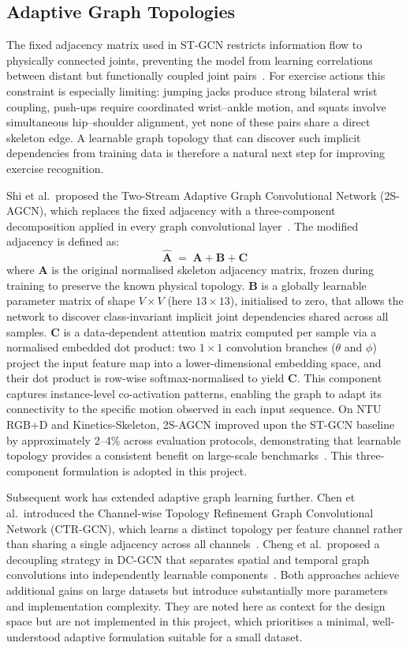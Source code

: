 \subsection{Adaptive Graph Topologies}
The fixed adjacency matrix used in ST-GCN restricts information flow to physically connected joints, preventing the model from learning correlations between distant but functionally coupled joint pairs~\cite{shi2019two}. For exercise actions this constraint is especially limiting: jumping jacks produce strong bilateral wrist coupling, push-ups require coordinated wrist--ankle motion, and squats involve simultaneous hip--shoulder alignment, yet none of these pairs share a direct skeleton edge. A learnable graph topology that can discover such implicit dependencies from training data is therefore a natural next step for improving exercise recognition.

Shi et al.\ proposed the Two-Stream Adaptive Graph Convolutional Network (2S-AGCN), which replaces the fixed adjacency with a three-component decomposition applied in every graph convolutional layer~\cite{shi2019two}. The modified adjacency is defined as:
%
\begin{equation}
    \hat{\mathbf{A}} \;=\; \mathbf{A} + \mathbf{B} + \mathbf{C}
    \label{eq:adaptive-adj}
\end{equation}
%
where $\mathbf{A}$ is the original normalised skeleton adjacency matrix, frozen during training to preserve the known physical topology. $\mathbf{B}$ is a globally learnable parameter matrix of shape $V \times V$ (here $13 \times 13$), initialised to zero, that allows the network to discover class-invariant implicit joint dependencies shared across all samples. $\mathbf{C}$ is a data-dependent attention matrix computed per sample via a normalised embedded dot product: two $1 \times 1$ convolution branches ($\theta$ and $\phi$) project the input feature map into a lower-dimensional embedding space, and their dot product is row-wise softmax-normalised to yield $\mathbf{C}$. This component captures instance-level co-activation patterns, enabling the graph to adapt its connectivity to the specific motion observed in each input sequence. On NTU RGB+D and Kinetics-Skeleton, 2S-AGCN improved upon the ST-GCN baseline by approximately 2--4\% across evaluation protocols, demonstrating that learnable topology provides a consistent benefit on large-scale benchmarks~\cite{shi2019two}. This three-component formulation is adopted in this project.

Subsequent work has extended adaptive graph learning further. Chen et al.\ introduced the Channel-wise Topology Refinement Graph Convolutional Network (CTR-GCN), which learns a distinct topology per feature channel rather than sharing a single adjacency across all channels~\cite{chen2021ctr}. Cheng et al.\ proposed a decoupling strategy in DC-GCN that separates spatial and temporal graph convolutions into independently learnable components~\cite{cheng2020dcgcn}. Both approaches achieve additional gains on large datasets but introduce substantially more parameters and implementation complexity. They are noted here as context for the design space but are not implemented in this project, which prioritises a minimal, well-understood adaptive formulation suitable for a small dataset.

